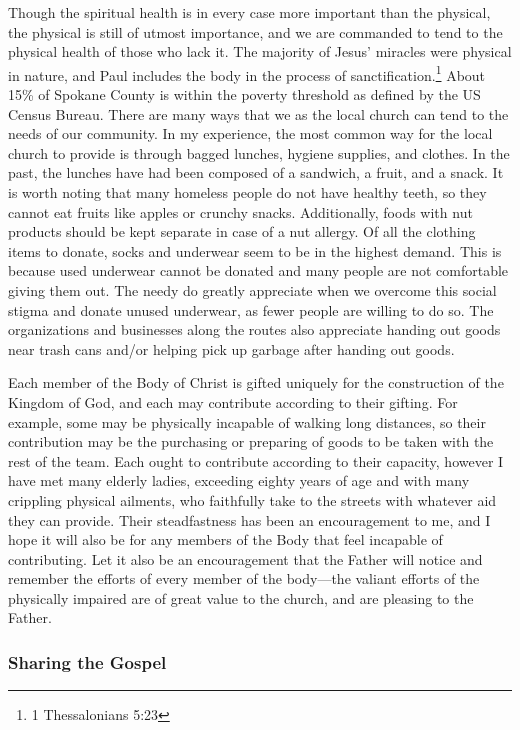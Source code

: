 \documentclass[12pt]{article}
\begin{document}
    \qJamesPhysical
    Though the spiritual health is in every case more important than the physical, the physical is still of utmost importance, and we are commanded to tend to the physical health of those who lack it.
    The majority of Jesus' miracles were physical in nature, and Paul includes the body in the process of sanctification.\footnote{1 Thessalonians 5:23}
    About 15\% of Spokane County is within the poverty threshold as defined by the US Census Bureau\cite{census}.
    There are many ways that we as the local church can tend to the needs of our community.
    In my experience, the most common way for the local church to provide is through bagged lunches, hygiene supplies, and clothes.
    In the past, the lunches have had been composed of a sandwich, a fruit, and a snack.
    It is worth noting that many homeless people do not have healthy teeth, so they cannot eat fruits like apples or crunchy snacks.
    Additionally, foods with nut products should be kept separate in case of a nut allergy.
    Of all the clothing items to donate, socks and underwear seem to be in the highest demand.
    This is because used underwear cannot be donated and many people are not comfortable giving them out.
    The needy do greatly appreciate when we overcome this social stigma and donate unused underwear, as fewer people are willing to do so.
    The organizations and businesses along the routes also appreciate handing out goods near trash cans and/or helping pick up garbage after handing out goods.

    \qHebSix
    Each member of the Body of Christ is gifted uniquely for the construction of the Kingdom of God, and each may contribute according to their gifting.
    For example, some may be physically incapable of walking long distances, so their contribution may be the purchasing or preparing of goods to be taken with the rest of the team.
    Each ought to contribute according to their capacity, however I have met many elderly ladies, exceeding eighty years of age and with many crippling physical ailments, who faithfully take to the streets with whatever aid they can provide.
    Their steadfastness has been an encouragement to me, and I hope it will also be for any members of the Body that feel incapable of contributing.
    Let it also be an encouragement that the Father will notice and remember the efforts of every member of the body---the valiant efforts of the physically impaired are of great value to the church, and are pleasing to the Father.

\subsubsection{Sharing the Gospel}
\end{document}
